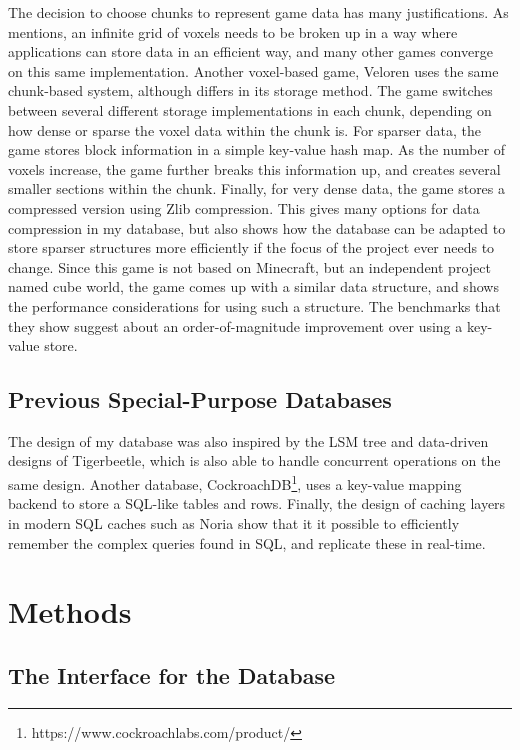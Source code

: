 \documentclass[10pt,twocolumn]{article}
\begin{document}
The decision to choose chunks to represent game data has many justifications. As
\cite{gorte2023analysis} mentions, an infinite grid of voxels needs to be broken
up in a way where applications can store data in an efficient way, and many
other games converge on this same implementation. Another voxel-based game,
Veloren\cite{https://veloren.net} uses the same chunk-based system, although
differs in its storage method. The game switches between several different
storage implementations in each chunk, depending on how dense or sparse the voxel
data within the chunk is. For sparser data, the game stores block information in
a simple key-value hash map. As the number of voxels increase, the game further
breaks this information up, and creates several smaller sections within the
chunk. Finally, for very dense data, the game stores a compressed version using
Zlib compression\cite{veloren32}. This gives many options for data compression
in my database, but also shows how the database can be adapted to store sparser
structures more efficiently if the focus of the project ever needs to change.
Since this game is not based on Minecraft, but an independent project named cube
world, the game comes up with a similar data structure, and shows the
performance considerations for using such a structure. The benchmarks that they
show suggest about an order-of-magnitude improvement over using a key-value
store.

\subsection{Previous Special-Purpose Databases}

The design of my database was also inspired by the LSM tree and data-driven
designs of Tigerbeetle\cite{tigerbeetleDesign}, which is also able to handle
concurrent operations on the same design. Another database,
CockroachDB\footnote{https://www.cockroachlabs.com/product/}, uses a key-value
mapping backend to store a SQL-like tables and rows. Finally, the design of
caching layers in modern SQL caches such as Noria\cite{gjengset2018noria} show
that it it possible to efficiently remember the complex queries found in SQL,
and replicate these in real-time.

\section{Methods}

\subsection{The Interface for the Database}
\end{document}
